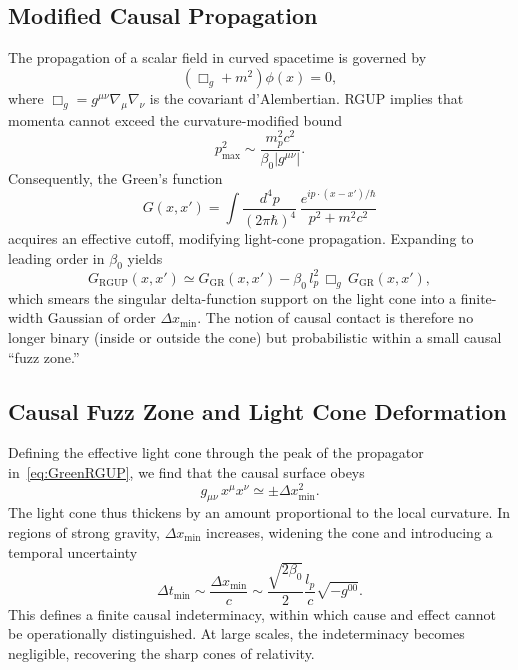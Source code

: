\documentclass[11pt,oneside]{book}
\numberwithin{equation}{chapter}
\begin{document}
\subsection*{Modified Causal Propagation}

The propagation of a scalar field in curved spacetime is governed by
\begin{equation}
(\Box_g + m^2)\phi(x) = 0,
\end{equation}
where \(\Box_g = g^{\mu\nu}\nabla_\mu\nabla_\nu\) is the covariant d’Alembertian.  
RGUP implies that momenta cannot exceed the curvature-modified bound
\begin{equation}
p_{\text{max}}^2 \sim \frac{m_p^2 c^2}{\beta_0 |g^{\mu\nu}|}.
\end{equation}
Consequently, the Green’s function
\begin{equation}
G(x,x') = \int \frac{d^4p}{(2\pi\hbar)^4}\,
\frac{e^{ip\cdot(x-x')/\hbar}}{p^2+m^2c^2}
\end{equation}
acquires an effective cutoff, modifying light-cone propagation.  
Expanding to leading order in \(\beta_0\) yields
\begin{equation}
G_{\text{RGUP}}(x,x')
\simeq
G_{\text{GR}}(x,x')
- \beta_0\,l_p^2\,\Box_g\,G_{\text{GR}}(x,x'),
\label{eq:GreenRGUP}
\end{equation}
which smears the singular delta-function support on the light cone into a finite-width Gaussian of order \(\Delta x_{\min}\).  
The notion of causal contact is therefore no longer binary (inside or outside the cone) but probabilistic within a small causal “fuzz zone.”

\subsection*{Causal Fuzz Zone and Light Cone Deformation}

Defining the effective light cone through the peak of the propagator in~\eqref{eq:GreenRGUP}, we find that the causal surface obeys
\begin{equation}
g_{\mu\nu}\,x^\mu x^\nu 
\simeq 
\pm \Delta x_{\min}^2.
\label{eq:causalfuzz}
\end{equation}
The light cone thus thickens by an amount proportional to the local curvature.  
In regions of strong gravity, $\Delta x_{\min}$ increases, widening the cone and introducing a temporal uncertainty
\begin{equation}
\Delta t_{\min}
\sim
\frac{\Delta x_{\min}}{c}
\sim
\frac{\sqrt{2\beta_0}}{2}\frac{l_p}{c}
\sqrt{-g^{00}}.
\end{equation}
This defines a finite causal indeterminacy, within which cause and effect cannot be operationally distinguished.  
At large scales, the indeterminacy becomes negligible, recovering the sharp cones of relativity.
\end{document}

